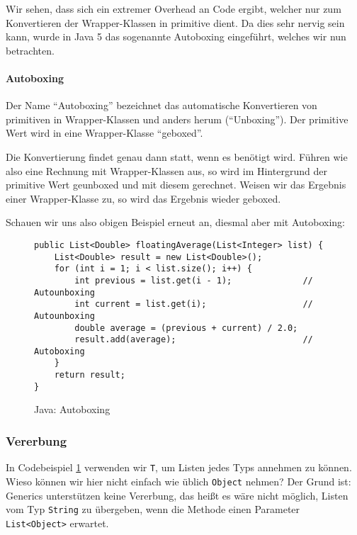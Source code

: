 		Wir sehen, dass sich ein extremer Overhead an Code ergibt, welcher nur zum Konvertieren der Wrapper-Klassen in primitive dient. Da dies sehr nervig sein kann, wurde in Java 5 das sogenannte Autoboxing eingeführt, welches wir nun betrachten.
	
		\paragraph{Autoboxing}
			Der Name \enquote{Autoboxing} bezeichnet das automatische Konvertieren von primitiven in Wrapper-Klassen und anders herum (\enquote{Unboxing}). Der primitive Wert wird in eine Wrapper-Klasse \enquote{geboxed}.
			
			Die Konvertierung findet genau dann statt, wenn es benötigt wird. Führen wie also eine Rechnung mit Wrapper-Klassen aus, so wird im Hintergrund der primitive Wert geunboxed und mit diesem gerechnet. Weisen wir das Ergebnis einer Wrapper-Klasse zu, so wird das Ergebnis wieder geboxed.
			
			
			Schauen wir uns also obigen Beispiel erneut an, diesmal aber mit Autoboxing:
			\begin{figure}[H]
				\centering
				\begin{lstlisting}
public List<Double> floatingAverage(List<Integer> list) {
	List<Double> result = new List<Double>();
	for (int i = 1; i < list.size(); i++) {
		int previous = list.get(i - 1);              // Autounboxing
		int current = list.get(i);                   // Autounboxing
		double average = (previous + current) / 2.0;
		result.add(average);                         // Autoboxing
	}
	return result;
}
				\end{lstlisting}
				\caption{Java: Autoboxing}
				\label{fig:java_generics_motivation_gen}
			\end{figure}
	
	\subsubsection{Vererbung}
		In Codebeispiel \ref{fig:java_generics_motivation_gen} verwenden wir \texttt{T}, um Listen jedes Typs annehmen zu können. Wieso können wir hier nicht einfach wie üblich \texttt{Object} nehmen? Der Grund ist: Generics unterstützen keine Vererbung, das heißt es wäre nicht möglich, Listen vom Typ \texttt{String} zu übergeben, wenn die Methode einen Parameter \texttt{List<Object>} erwartet.
		
